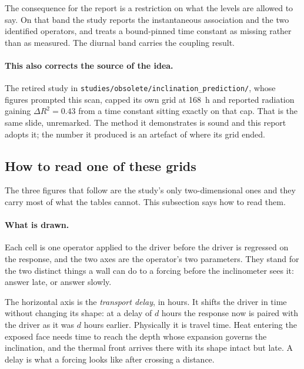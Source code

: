 \documentclass[11pt,a4paper]{article}
\begin{document}
The consequence for the report is a restriction on what the levels are allowed
to say. On that band the study reports the instantaneous association and the two
identified operators, and treats a bound-pinned time constant as missing rather
than as measured. The diurnal band carries the coupling result.

\paragraph{This also corrects the source of the idea.} The retired study in
\texttt{studies/obsolete/inclination\_prediction/}, whose figures prompted this
scan, capped its own grid at 168~h and reported radiation gaining
$\Delta R^2 = 0.43$ from a time constant sitting exactly on that cap. That is
the same slide, unremarked. The method it demonstrates is sound and this report
adopts it; the number it produced is an artefact of where its grid ended.

\subsection{How to read one of these grids}
\label{sec:reading}

The three figures that follow are the study's only two-dimensional ones and
they carry most of what the tables cannot. This subsection says how to read
them.

\paragraph{What is drawn.} Each cell is one operator applied to the driver
before the driver is regressed on the response, and the two axes are the
operator's two parameters. They stand for the two distinct things a wall can do
to a forcing before the inclinometer sees it: answer late, or answer slowly.

The horizontal axis is the \emph{transport delay}, in hours. It shifts the
driver in time without changing its shape: at a delay of $d$ hours the response
now is paired with the driver as it was $d$ hours earlier. Physically it is
travel time. Heat entering the exposed face needs time to reach the depth whose
expansion governs the inclination, and the thermal front arrives there with its
shape intact but late. A delay is what a forcing looks like after crossing a
distance.
\end{document}
